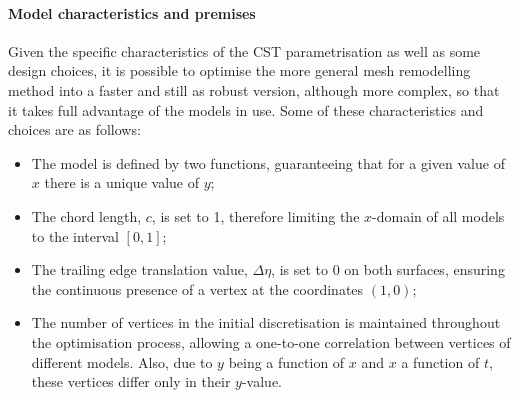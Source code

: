 \paragraph{Model characteristics and premises} Given the specific characteristics of the CST parametrisation as well as some design choices, it is possible to optimise the more general mesh remodelling method into a faster and still as robust version, although more complex, so that it takes full advantage of the models in use. Some of these characteristics and choices are as follows:
\begin{itemize}
\item The model is defined by two functions, guaranteeing that for a given value of $x$ there is a unique value of $y$;
\item The chord length, $c$, is set to 1, therefore limiting the $x$-domain of all models to the interval $[0,1]$;
\item The trailing edge translation value, $\Delta\eta$, is set to 0 on both surfaces, ensuring the continuous presence of a vertex at the coordinates $(1,0)$;
\item The number of vertices in the initial discretisation is maintained throughout the optimisation process, allowing a one-to-one correlation between vertices of different models. Also, due to $y$ being a function of $x$ and $x$ a function of $t$, these vertices differ only in their $y$-value.
\end{itemize}

